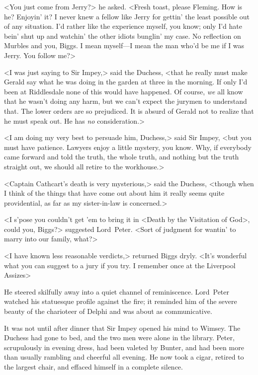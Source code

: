<You just come from Jerry?> he asked. <Fresh toast, please Fleming. How is he? Enjoyin' it? I never knew a fellow like Jerry for gettin' the least possible out of any situation. I'd rather like the experience myself, you know; only I'd hate bein' shut up and watchin' the other idiots bunglin' my case. No reflection on Murbles and you, Biggs. I mean myself—I mean the man who'd be me if I was Jerry. You follow me?>

<I was just saying to Sir Impey,> said the Duchess, <that he really must make Gerald say what he was doing in the garden at three in the morning. If only I'd been at Riddlesdale none of this would have happened. Of course, \emph{we} all know that he wasn't doing any harm, but we can't expect the jurymen to understand that. The lower orders are so prejudiced. It is absurd of Gerald not to realize that he must speak out. He has \emph{no} consideration.>

<I am doing my very best to persuade him, Duchess,> said Sir Impey, <but you must have patience. Lawyers enjoy a little mystery, you know.  Why, if everybody came forward and told the truth, the whole truth, and nothing but the truth straight out, we should all retire to the workhouse.>

<Captain Cathcart's death is very mysterious,> said the Duchess, <though when I think of the things that have come out about him it really seems quite providential, as far as my sister-in-law is concerned.>

<I s'pose you couldn't get 'em to bring it in <Death by the Visitation of God>, could you, Biggs?> suggested Lord~Peter. <Sort of judgment for wantin' to marry into our family, what?>

<I have known less reasonable verdicts,> returned Biggs dryly. <It's wonderful what you can suggest to a jury if you try. I remember once at the Liverpool Assizes\longdash>

He steered skilfully away into a quiet channel of reminiscence. Lord~Peter watched his statuesque profile against the fire; it reminded him of the severe beauty of the charioteer of Delphi and was about as communicative.

\divider

It was not until after dinner that Sir Impey opened his mind to Wimsey.  The Duchess had gone to bed, and the two men were alone in the library.  Peter, scrupulously in evening dress, had been valeted by Bunter, and had been more than usually rambling and cheerful all evening. He now took a cigar, retired to the largest chair, and effaced himself in a complete silence.

